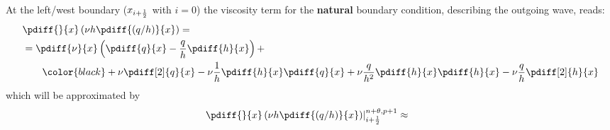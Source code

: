 At the left/west boundary ($x_{i+\frac{1}{2}}$ with $i=0$) the viscosity term for the \textbf{natural} boundary condition, describing the outgoing wave, reads:
%
\begin{align}
    &\pdiff{}{x}\left(\nu h \pdiff{(q/h)}{x}\right) =
    \\
    & = \pdiff{\nu}{x} \left(\pdiff{q}{x} - \frac{q}{h}\pdiff{h}{x}\right) +
    \nonumber \\*
    &\qquad  {\color{black}
        + \nu \pdiff[2]{q}{x}
        - \nu \frac{1}{h} \pdiff{h}{x}\pdiff{q}{x}
        + \nu \frac{q}{h^2} \pdiff{h}{x}\pdiff{h}{x}
        - \nu \frac{q}{h} \pdiff[2]{h}{x}
    }
\end{align}
which will be approximated by
\begin{align}
&\left.  \pdiff{}{x}\left( \nu h \pdiff{(q/h)}{x} \right)  \right|^{n+\theta, p+1}_{i+\half} \approx
\end{align}
